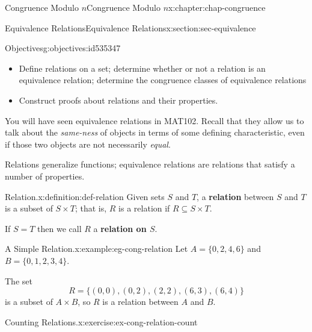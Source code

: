 \documentclass[oneside,10pt,]{book}
\newcommand{\terminology}[1]{\textbf{#1}}
\numberwithin{equation}{section}
\begin{document}
%
%
\typeout{************************************************}
\typeout{************************************************}
%
\begin{chapterptx}{Congruence Modulo \(n\)}{}{Congruence Modulo \(n\)}{}{}{x:chapter:chap-congruence}
%
%
\typeout{************************************************}
\typeout{************************************************}
%
\begin{sectionptx}{Equivalence Relations}{}{Equivalence Relations}{}{}{x:section:sec-equivalence}
\begin{objectives}{Objectives}{g:objectives:id535347}
%
\begin{itemize}[label=\textbullet]
\item{}Define relations on a set; determine whether or not a relation is an equivalence relation; determine the congruence classes of equivalence relations%
\item{}Construct proofs about relations and their properties.%
\end{itemize}
\end{objectives}
You will have seen equivalence relations in MAT102. Recall that they allow us to talk about the \emph{same-ness} of objects in terms of some defining characteristic, even if those two objects are not necessarily \emph{equal}.%
\par
Relations generalize functions; equivalence relations are relations that satisfy a number of properties.%
\begin{definition}{Relation.}{x:definition:def-relation}%
Given sets \(S\) and \(T\), a \terminology{relation} between \(S\) and \(T\) is a subset of \(S \times T\); that is, \(R\) is a relation if \(R \subseteq S \times T\).%
\par
If \(S = T\) then we call \(R\) a \terminology{relation on \(S\)}.%
\end{definition}
\begin{example}{A Simple Relation.}{x:example:eg-cong-relation}%
Let \(A = \{0,2,4,6\}\) and \(B = \{0,1,2,3,4\}\).%
\par
The set%
\begin{equation*}
R = \{(0,0),(0,2),(2,2),(6,3),(6,4)\}
\end{equation*}
is a subset of \(A \times B\), so \(R\) is a relation between \(A\) and \(B\).%
\end{example}
\begin{inlineexercise}{Counting Relations.}{x:exercise:ex-cong-relation-count}%

\end{inlineexercise}
\end{sectionptx}
\end{chapterptx}
\end{document}
